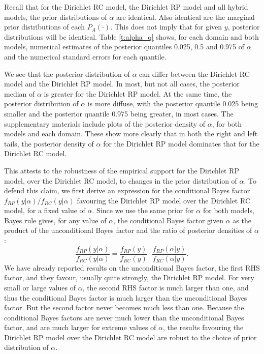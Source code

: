 \documentclass[11pt,letter]{article}
\newcommand{\Dpi}{Dirichlet RP model}
\newcommand{\DP}{Dirichlet RC model}
\begin{document}
Recall that for the \DP{}, the \Dpi{} and all hybrid models, the prior distributions of $\alpha$ are identical.
Also identical are the marginal prior distributions of each $P_A(\cdot)$.
This does not imply that for given $y$, posterior distributions will be identical.
%  
Table \ref{t:alpha_q} shows, for each domain and both models, numerical estimates of the posterior quantiles 0.025, 0.5 and 0.975 of $\alpha$ and the numerical standard errors for each quantile.
\begin{table}
  
  \caption{Posterior quantiles of $\alpha$, and their numerical standard errors, for the \DP{} and \Dpi{}, by  domain}
  \label{t:alpha_q}
\end{table}
We see that the posterior distribution of $\alpha$ can differ between the \DP{} and the \Dpi{}.
In most, but not all cases, the posterior median of $\alpha$ is greater for the \Dpi{}.
At the same time, the posterior distribution of $\alpha$ is more diffuse, with the posterior quantile 0.025 being smaller and the posterior quantile 0.975 being greater, in most cases.
The supplementary materials include plots of the posterior density of $\alpha$, for both models and each domain.
These show more clearly that in both the right and left tails, the posterior density of $\alpha$ for the \Dpi{} dominates that for the \DP{}.

This attests to the robustness of the empirical support for the \Dpi{}, over the \DP{}, to changes in the prior distribution of $\alpha$.
To defend this claim, we first derive an expression for the conditional Bayes factor $f_{RP}(y|\alpha)/f_{RC}(y|\alpha)$ favouring the \Dpi{} over the \DP{}, for a fixed value of $\alpha$.
Since we use the same prior for $\alpha$ for both models, Bayes rule gives, for any value of $\alpha$, the conditional Bayes factor given $\alpha$ as the product of the unconditional Bayes factor and the ratio of posterior densities of $\alpha$:
\[
  \frac{f_{RP}(y|\alpha)}{f_{RC}(y|\alpha)} = \frac{f_{RP}(y)}{f_{RC}(y)} \cdot \frac{f_{RP}(\alpha|y)}{f_{RC}(\alpha|y)}.
\]
We have already reported results on the unconditional Bayes factor, the first RHS factor, and they favour, usually quite strongly, the \Dpi{}.
For very small or large values of $\alpha$, the second RHS factor is much larger than one, and thus the conditional Bayes factor is much larger than the unconditional Bayes factor.
But the second factor never becomes much less than one.
Because the conditional Bayes factors are never much lower than the unconditional Bayes factor, and are much larger for extreme values of $\alpha$, the results favouring the \Dpi{} over the \DP{} are robust to the choice of prior distribution of $\alpha$.
\end{document}
